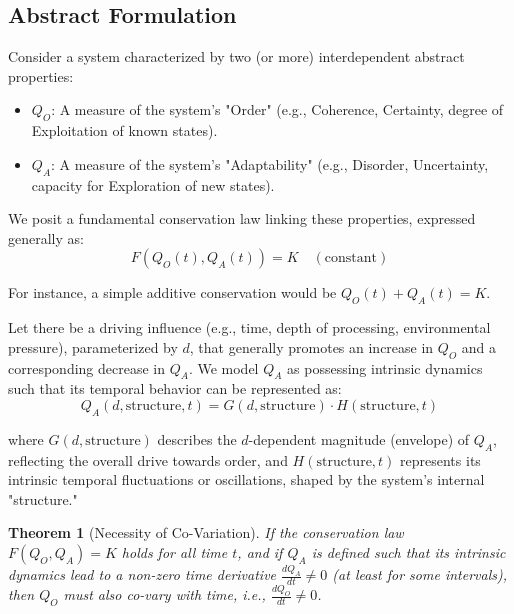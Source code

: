 \documentclass[11pt,a4paper]{article}
\newtheorem{theorem}{Theorem}[section]
\begin{document}
\subsection{Abstract Formulation}

Consider a system characterized by two (or more) interdependent abstract properties:
\begin{itemize}
    \item $Q_O$: A measure of the system's "Order" (e.g., Coherence, Certainty, degree of Exploitation of known states).
    \item $Q_A$: A measure of the system's "Adaptability" (e.g., Disorder, Uncertainty, capacity for Exploration of new states).
\end{itemize}

We posit a fundamental conservation law linking these properties, expressed generally as:
\begin{equation}
    F(Q_O(t), Q_A(t)) = K \quad (\text{constant})
\end{equation}

For instance, a simple additive conservation would be $Q_O(t) + Q_A(t) = K$.

Let there be a driving influence (e.g., time, depth of processing, environmental pressure), parameterized by $d$, that generally promotes an increase in $Q_O$ and a corresponding decrease in $Q_A$. We model $Q_A$ as possessing intrinsic dynamics such that its temporal behavior can be represented as:
\begin{equation}
    Q_A(d, \text{structure}, t) = G(d, \text{structure}) \cdot H(\text{structure}, t)
\end{equation}

where $G(d, \text{structure})$ describes the $d$-dependent magnitude (envelope) of $Q_A$, reflecting the overall drive towards order, and $H(\text{structure}, t)$ represents its intrinsic temporal fluctuations or oscillations, shaped by the system's internal "structure."

\begin{theorem}[Necessity of Co-Variation]
If the conservation law $F(Q_O, Q_A) = K$ holds for all time $t$, and if $Q_A$ is defined such that its intrinsic dynamics lead to a non-zero time derivative $\frac{dQ_A}{dt} \neq 0$ (at least for some intervals), then $Q_O$ must also co-vary with time, i.e., $\frac{dQ_O}{dt} \neq 0$.
\end{theorem}
\end{document}

